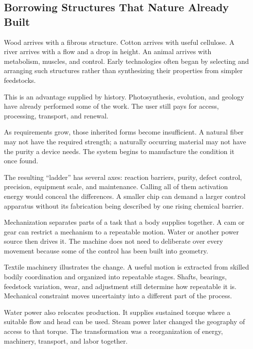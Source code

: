 \subsection{Borrowing Structures That Nature Already Built}


Wood arrives with a fibrous structure. Cotton arrives with useful cellulose. A river arrives with a flow and a drop in height. An animal arrives with metabolism, muscles, and control. Early technologies often began by selecting and arranging such structures rather than synthesizing their properties from simpler feedstocks.

This is an advantage supplied by history. Photosynthesis, evolution, and geology have already performed some of the work. The user still pays for access, processing, transport, and renewal.

As requirements grow, those inherited forms become insufficient. A natural fiber may not have the required strength; a naturally occurring material may not have the purity a device needs. The system begins to manufacture the condition it once found.

The resulting “ladder” has several axes: reaction barriers, purity, defect control, precision, equipment scale, and maintenance. Calling all of them activation energy would conceal the differences. A smaller chip can demand a larger control apparatus without its fabrication being described by one rising chemical barrier.


Mechanization separates parts of a task that a body supplies together. A cam or gear can restrict a mechanism to a repeatable motion. Water or another power source then drives it. The machine does not need to deliberate over every movement because some of the control has been built into geometry.

Textile machinery illustrates the change. A useful motion is extracted from skilled bodily coordination and organized into repeatable stages. Shafts, bearings, feedstock variation, wear, and adjustment still determine how repeatable it is. Mechanical constraint moves uncertainty into a different part of the process.

Water power also relocates production. It supplies sustained torque where a suitable flow and head can be used. Steam power later changed the geography of access to that torque. The transformation was a reorganization of energy, machinery, transport, and labor together.\cite{smil2017energy}

